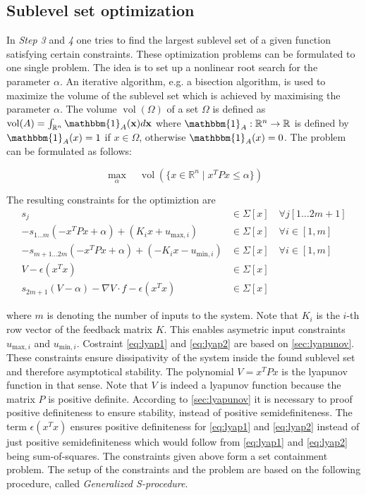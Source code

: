 \documentclass[10pt,a4paper,titlepage]{article}
\begin{document}
\subsection{Sublevel set optimization}
In \textit{Step 3} and \textit{4} one tries to find the largest sublevel set of a given function satisfying certain constraints. These optimization problems
can be formulated to one single problem. The idea is to set up a nonlinear root search for the parameter $\alpha$. An iterative 
algorithm, e.g. a bisection algorithm, is used to maximize the volume of the sublevel set which is achieved by maximising the parameter $\alpha$. The volume
$\operatorname{vol}\left( \Omega \right)$ of a set $\Omega$ is defined as $\operatorname{vol}(A)=\int_{\mathbb{R}^n} \mathbbm{1}_A(\mathbf{x}) d \mathbf{x}$
where $\mathbbm{1}_A : \mathbb{R}^n \rightarrow \mathbb{R}$ is defined by $\mathbbm{1}_A(x) = 1$ if $x \in \Omega$, otherwise $\mathbbm{1}_A(x) = 0$.
The problem can be formulated as follows:

\begin{equation}
\label{eq:sos_problem}
\max\limits_{\alpha} \quad \operatorname{vol}\left(\{x \in \mathbb{R}^n \mid x^TPx \leq \alpha \}\right)
\end{equation}

The resulting constraints for the optimiztion are
\begin{align}
	s_{j} &\in \Sigma[x] \quad \forall j [1 \dots 2m+1]\\
	-s_{1 \dots m}(-x^TPx + \alpha) + (K_i x + u_{\text{max},i}) &\in \Sigma[x] \quad \forall i \in [1,m]\\
	-s_{m+1 \dots 2m}(-x^TPx + \alpha) + (-K_i x - u_{\text{min},i}) &\in \Sigma[x] \quad \forall i \in [1,m]\\
	V - \epsilon (x^Tx) &\in \Sigma[x] \label{eq:lyap1} \\
	s_{2m+1}(V-\alpha) - \nabla V \cdot f - \epsilon (x^Tx) &\in \Sigma[x] \label{eq:lyap2}
\end{align}

where $m$ is denoting the number of inputs to the system. Note that $K_i$ is the $i$-th row vector of the feedback matrix $K$. This enables
asymetric input constraints $u_{\text{max},i}$ and $u_{\text{min},i}$. Costraint \eqref{eq:lyap1} and \eqref{eq:lyap2} are based on \ref{sec:lyapunov}.
These constraints ensure dissipativity of the system inside the found sublevel set and
therefore asymptotical stability. The polynomial $V=x^TPx$ is the lyapunov function in that sense. Note that $V$ is indeed a lyapunov function because the matrix 
$P$ is positive definite. According to \ref{sec:lyapunov} it is necessary to proof positive definiteness to ensure stability, instead of
positive semidefiniteness. The term $\epsilon (x^Tx)$ ensures positive definiteness for \eqref{eq:lyap1} and \eqref{eq:lyap2} instead of just positive semidefiniteness which would follow
from \eqref{eq:lyap1} and \eqref{eq:lyap2} being sum-of-squares. The constraints given above form a set containment problem. The setup of the constraints and the problem are based on the
following procedure, called \textit{Generalized S-procedure}.
\end{document}
